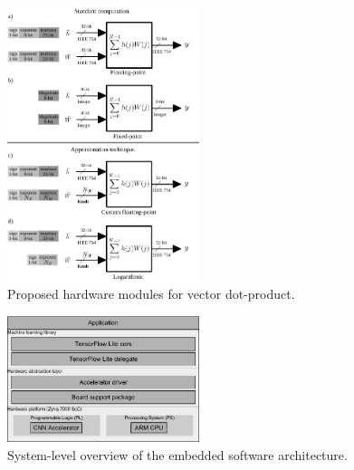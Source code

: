 \begin{figure}[t!]
	\centering
	\includegraphics[width=0.5\textwidth]{../figures/dot-product_unit.pdf}
	\caption{Proposed hardware modules for vector dot-product.}
	\label{fig:dot_product}
\end{figure}

\begin{figure}[t!]
	\centering
	\includegraphics[width=0.5\textwidth]{../figures/sw_stack.pdf}
	\caption{System-level overview of the embedded software architecture.}
	\label{fig:sw_stack}
\end{figure}

